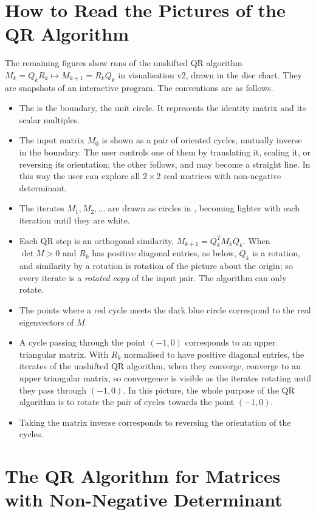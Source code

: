 \documentclass[12pt, a4paper]{report}
\newcommand{\tmcolor}[2]{{\color{#1}{#2}}}
\newenvironment{itemizedot}{\begin{itemize} \renewcommand{\labelitemi}{$\bullet$}\renewcommand{\labelitemii}{$\bullet$}\renewcommand{\labelitemiii}{$\bullet$}\renewcommand{\labelitemiv}{$\bullet$}}{\end{itemize}}
\theoremstyle{plain}
\theoremstyle{definition}
\theoremstyle{remark}
\theoremstyle{plain}
\begin{document}
\section{How to Read the Pictures of the QR Algorithm}
\label{sec:reading}
The remaining figures show runs of the unshifted QR algorithm $M_{k}=Q_kR_k\mapsto M_{k+1}=R_kQ_k$ in visualisation v2, drawn in the disc chart. They are snapshots of an interactive program. The conventions are as follows.
\begin{itemizedot}
  \item The \tmcolor{blue}{dark blue circle} is the boundary, the unit circle. It represents the identity matrix and its scalar multiples.
  \item The input matrix $M_0$ is shown as a pair of \tmcolor{red}{red} oriented cycles, mutually inverse in the boundary. The user controls one of them by translating it, scaling it, or reversing its orientation; the other follows, and may become a straight line. In this way the user can explore all $2\times2$ real matrices with non-negative determinant.
  \item The iterates $M_1,M_2,\dots$ are drawn as circles in \tmcolor{cyan}{light blue}, becoming lighter with each iteration until they are white.
  \item Each QR step is an orthogonal similarity, $M_{k+1}=Q_k^TM_kQ_k$. When $\det M>0$ and $R_k$ has positive diagonal entries, as below, $Q_k$ is a rotation, and similarity by a rotation is rotation of the picture about the origin; so every iterate is a \emph{rotated copy} of the input pair. The algorithm can only rotate.
  \item The points where a red cycle meets the dark blue circle correspond to the real eigenvectors of $M$.
  \item A cycle passing through the point $(-1,0)$ corresponds to an upper triangular matrix. With $R_k$ normalised to have positive diagonal entries, the iterates of the unshifted QR algorithm, when they converge, converge to an upper triangular matrix, so convergence is visible as the iterates rotating until they pass through $(-1,0)$. In this picture, the whole purpose of the QR algorithm is to rotate the pair of cycles towards the point $(-1,0)$.
  \item Taking the matrix inverse corresponds to reversing the orientation of the cycles.
\end{itemizedot}

\section{The QR Algorithm for Matrices with Non-Negative Determinant}
\label{sec:qr-nonneg}
\end{document}
